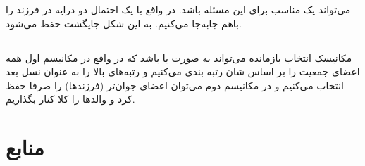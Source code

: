 \documentclass{article}
\begin{document}
\subsubsection{}
 می‌تواند یک  مناسب برای این مسئله باشد. در واقع با یک احتمال دو درایه در فرزند را باهم جابه‌جا می‌کنیم. به این شکل جایگشت حفظ می‌شود.
\subsection{}
مکانیسک انتخاب بازمانده می‌تواند به صورت  یا  باشد که در واقع در مکانیسم اول همه اعضای جمعیت را بر اساس شان رتبه بندی می‌کنیم و رتبه‌های بالا را به عنوان نسل بعد انتخاب می‌کنیم و در مکانیسم دوم می‌توان اعضای جوان‌تر (فرزندها) را صرفا حفظ کرد و والدها را کلا کنار بگذاریم.

\section{}



\section*{منابع}
\renewcommand{\section}[2]{}%
\begin{thebibliography}{99} %


\begin{LTRitems}

\resetlatinfont

\end{LTRitems}

\end{thebibliography}
\end{document}
